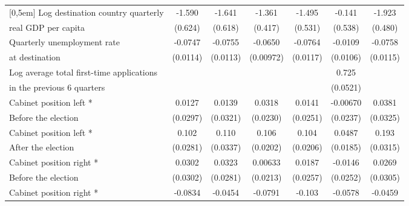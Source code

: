 \begin{table}[htbp]
\begin{tabular}{l*{6}{c}}
[0,5em]
Log destination country quarterly &      -1.590\sym{*}  &      -1.641\sym{**} &      -1.361\sym{**} &      -1.495\sym{**} &      -0.141         &      -1.923\sym{***}\\
real GDP per capita                    &     (0.624)         &     (0.618)         &     (0.417)         &     (0.531)         &     (0.538)         &     (0.480)         \\
[0,5em]
Quarterly unemployment rate &     -0.0747\sym{***}&     -0.0755\sym{***}&     -0.0650\sym{***}&     -0.0764\sym{***}&     -0.0109         &     -0.0758\sym{***}\\
at destination                    &    (0.0114)         &    (0.0113)         &   (0.00972)         &    (0.0117)         &    (0.0106)         &    (0.0115)         \\
[0,5em]
Log average total first-time applications &                     &                     &                     &                     &       0.725\sym{***}&                     \\
 in the previous 6 quarters                   &                     &                     &                     &                     &    (0.0521)         &                     \\
[0,5em]
Cabinet position left * &      0.0127         &      0.0139         &      0.0318         &      0.0141         &    -0.00670         &      0.0381         \\
Before the election                    &    (0.0297)         &    (0.0321)         &    (0.0230)         &    (0.0251)         &    (0.0237)         &    (0.0325)         \\
[0,5em]
Cabinet position left * &       0.102\sym{***}&       0.110\sym{**} &       0.106\sym{***}&       0.104\sym{***}&      0.0487\sym{*}  &       0.193\sym{***}\\
After the election                    &    (0.0281)         &    (0.0337)         &    (0.0202)         &    (0.0206)         &    (0.0185)         &    (0.0315)         \\
[0,5em]
Cabinet position right * &      0.0302         &      0.0323         &     0.00633         &      0.0187         &     -0.0146         &      0.0269         \\
Before the election                    &    (0.0302)         &    (0.0281)         &    (0.0213)         &    (0.0257)         &    (0.0252)         &    (0.0305)         \\
[0,5em]
Cabinet position right * &     -0.0834\sym{**} &     -0.0454         &     -0.0791\sym{**} &      -0.103\sym{***}&     -0.0578\sym{*}  &     -0.0459         \\

\end{tabular}
\end{table}
